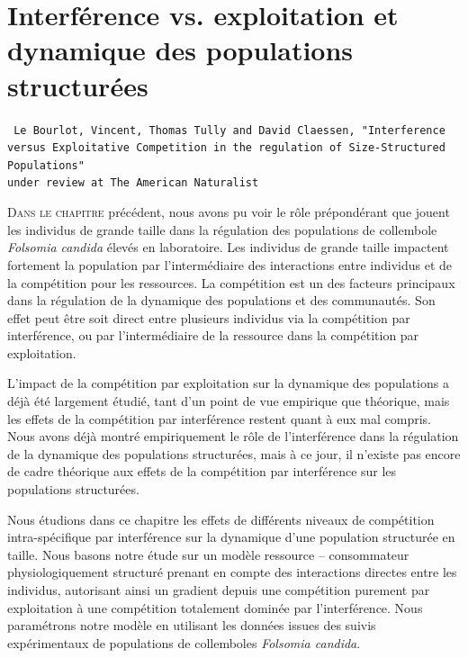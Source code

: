 \chapter[Interférence vs. exploitation et dynamique des populations
structurées][Interférence et populations structurées]{Interférence vs.
exploitation et dynamique des populations structurées}
\label{chap:amnat}

\vspace{2cm}
\begin{Spacing}{1}
\texttt{
Le Bourlot, Vincent, Thomas Tully and David Claessen, "Interference versus
Exploitative Competition in the regulation of Size-Structured Populations"\\
under review at The American Naturalist
}
\end{Spacing}
\vspace{2cm}


\lettrine[lines=3]{D}{ans le chapitre} précédent, nous avons pu voir le rôle
prépondérant que jouent les individus de grande taille dans la régulation des
populations de collembole \textit{Folsomia candida} élevés en laboratoire. Les
individus de grande taille impactent fortement la population par l'intermédiaire
des interactions entre individus et de la compétition pour les ressources. La
compétition est un des facteurs principaux dans la régulation de la dynamique
des populations et des communautés. Son effet peut être soit direct entre
plusieurs individus via la compétition par interférence, ou par l'intermédiaire
de la ressource dans la compétition par exploitation.

L'impact de la compétition par exploitation sur la dynamique des populations a
déjà été largement étudié, tant d'un point de vue empirique que théorique, mais
les effets de la compétition par interférence restent quant à eux mal compris.
Nous avons déjà montré empiriquement le rôle de l'interférence dans la
régulation de la dynamique des populations structurées, mais à ce jour, il
n'existe pas encore de cadre théorique aux effets de la compétition par
interférence sur les populations structurées.

Nous étudions dans ce chapitre les effets de différents niveaux de compétition
intra-spécifique par interférence sur la dynamique d'une population structurée
en taille. Nous basons notre étude sur un modèle ressource -- consommateur
physiologiquement structuré \autocites[modèle de ][]{kooijman1984a} prenant
en compte des interactions directes entre les individus, autorisant ainsi un
gradient depuis une compétition purement par exploitation à une compétition
totalement dominée par l'interférence. Nous paramétrons notre modèle en
utilisant les données issues des suivis expérimentaux de populations de
collemboles \textit{Folsomia candida}.

